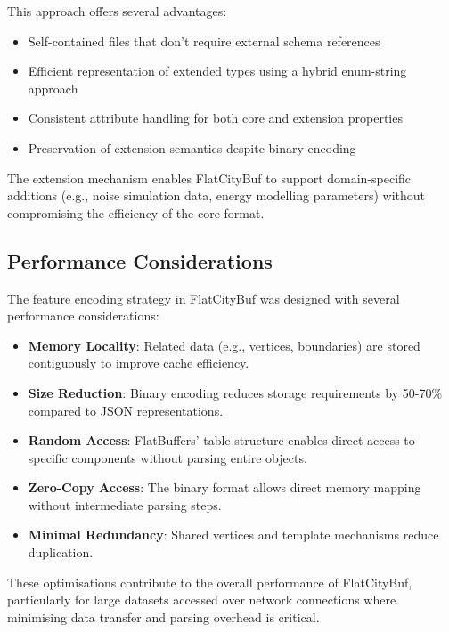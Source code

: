 This approach offers several advantages:
\begin{itemize}
    \item Self-contained files that don't require external schema references
    \item Efficient representation of extended types using a hybrid enum-string approach
    \item Consistent attribute handling for both core and extension properties
    \item Preservation of extension semantics despite binary encoding
\end{itemize}

The extension mechanism enables FlatCityBuf to support domain-specific additions (e.g., noise simulation data, energy modelling parameters) without compromising the efficiency of the core format.

\subsection{Performance Considerations}
\label{subsec:feature_performance}

The feature encoding strategy in FlatCityBuf was designed with several performance considerations:

\begin{itemize}
    \item \textbf{Memory Locality}: Related data (e.g., vertices, boundaries) are stored contiguously to improve cache efficiency.
    \item \textbf{Size Reduction}: Binary encoding reduces storage requirements by 50-70\% compared to JSON representations.
    \item \textbf{Random Access}: FlatBuffers' table structure enables direct access to specific components without parsing entire objects.
    \item \textbf{Zero-Copy Access}: The binary format allows direct memory mapping without intermediate parsing steps.
    \item \textbf{Minimal Redundancy}: Shared vertices and template mechanisms reduce duplication.
\end{itemize}

These optimisations contribute to the overall performance of FlatCityBuf, particularly for large datasets accessed over network connections where minimising data transfer and parsing overhead is critical.
